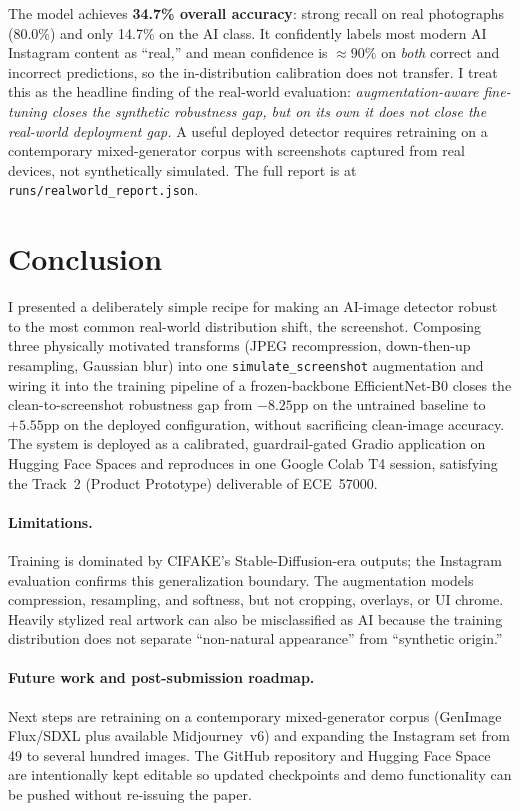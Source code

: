 \documentclass{article}
\begin{document}
The model achieves \textbf{34.7\% overall accuracy}: strong recall
on real photographs (80.0\%) and only 14.7\% on the AI class. It
confidently labels most modern AI Instagram content as ``real,'' and
mean confidence is $\approx 90\%$ on \emph{both} correct and
incorrect predictions, so the in-distribution calibration does not
transfer. I treat this as the headline finding of the real-world
evaluation: \emph{augmentation-aware fine-tuning closes the
synthetic robustness gap, but on its own it does not close the
real-world deployment gap.} A useful deployed detector requires
retraining on a contemporary mixed-generator corpus with screenshots
captured from real devices, not synthetically simulated. The full
report is at \texttt{runs/realworld\_report.json}.

\section{Conclusion}
\label{sec:conclusion}

I presented a deliberately simple recipe for making an AI-image
detector robust to the most common real-world distribution shift,
the screenshot. Composing three physically motivated transforms
(JPEG recompression, down-then-up resampling, Gaussian blur) into
one \texttt{simulate\_screenshot} augmentation and wiring it into
the training pipeline of a frozen-backbone EfficientNet-B0 closes
the clean-to-screenshot robustness gap from $-8.25$pp on the
untrained baseline to $+5.55$pp on the deployed configuration,
without sacrificing clean-image accuracy. The system is deployed as
a calibrated, guardrail-gated Gradio application on Hugging Face
Spaces and reproduces in one Google Colab T4 session, satisfying
the Track~2 (Product Prototype) deliverable of ECE~57000.

\paragraph{Limitations.}
Training is dominated by CIFAKE's Stable-Diffusion-era outputs;
the Instagram evaluation confirms this generalization boundary. The
augmentation models compression, resampling, and softness, but not
cropping, overlays, or UI chrome. Heavily stylized real artwork can
also be misclassified as AI because the training distribution does
not separate ``non-natural appearance'' from ``synthetic origin.''

\paragraph{Future work and post-submission roadmap.}
Next steps are retraining on a contemporary mixed-generator corpus
(GenImage Flux/SDXL plus available Midjourney~v6) and expanding the
Instagram set from 49 to several hundred images. The GitHub
repository and Hugging Face Space are intentionally kept editable
so updated checkpoints and demo functionality can be pushed without
re-issuing the paper.
\end{document}
